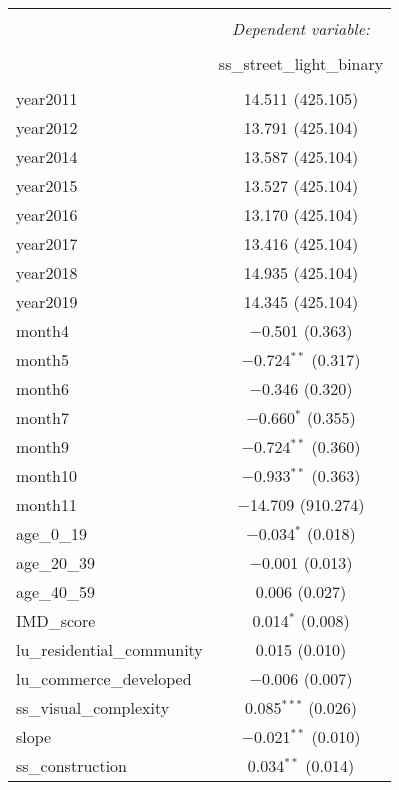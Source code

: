 \begin{table}[!htbp] \centering 
  \caption{} 
  \label{} 
\small 
\begin{tabular}{@{\extracolsep{1pt}}lc} 
\\[-1.8ex]\hline 
\hline \\[-1.8ex] 
 & \multicolumn{1}{c}{\textit{Dependent variable:}} \\ 
\cline{2-2} 
\\[-1.8ex] & ss\_street\_light\_binary \\ 
\hline \\[-1.8ex] 
 year2011 & 14.511 (425.105) \\ 
  year2012 & 13.791 (425.104) \\ 
  year2014 & 13.587 (425.104) \\ 
  year2015 & 13.527 (425.104) \\ 
  year2016 & 13.170 (425.104) \\ 
  year2017 & 13.416 (425.104) \\ 
  year2018 & 14.935 (425.104) \\ 
  year2019 & 14.345 (425.104) \\ 
  month4 & $-$0.501 (0.363) \\ 
  month5 & $-$0.724$^{**}$ (0.317) \\ 
  month6 & $-$0.346 (0.320) \\ 
  month7 & $-$0.660$^{*}$ (0.355) \\ 
  month9 & $-$0.724$^{**}$ (0.360) \\ 
  month10 & $-$0.933$^{**}$ (0.363) \\ 
  month11 & $-$14.709 (910.274) \\ 
  age\_0\_19 & $-$0.034$^{*}$ (0.018) \\ 
  age\_20\_39 & $-$0.001 (0.013) \\ 
  age\_40\_59 & 0.006 (0.027) \\ 
  IMD\_score & 0.014$^{*}$ (0.008) \\ 
  lu\_residential\_community & 0.015 (0.010) \\ 
  lu\_commerce\_developed & $-$0.006 (0.007) \\ 
  ss\_visual\_complexity & 0.085$^{***}$ (0.026) \\ 
  slope & $-$0.021$^{**}$ (0.010) \\ 
  ss\_construction & 0.034$^{**}$ (0.014) \\ 

\end{tabular}
\end{table}
